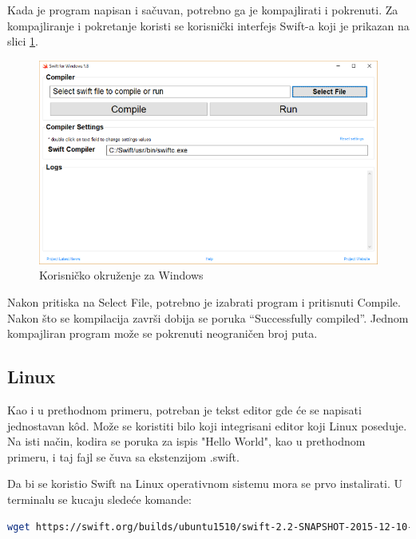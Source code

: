 \documentclass[a4paper]{article}
\begin{document}
Kada je program napisan i sačuvan, potrebno ga je kompajlirati i pokrenuti. Za kompajliranje i pokretanje koristi se korisnički interfejs Swift-a koji je prikazan na slici \ref{fig:windows}.

\begin{figure}[h!]
\begin{center}
\includegraphics[scale=0.27]{swift-win.png}
\end{center}
\caption{Korisničko okruženje za Windows}
\label{fig:windows}
\end{figure}

Nakon pritiska na Select File, potrebno je izabrati program i pritisnuti Compile. Nakon što se kompilacija završi dobija se poruka “Successfully compiled”.
Jednom kompajliran program može se pokrenuti neograničen broj puta.

\subsection{Linux}
\label{subsec:podnaslovLinux}
Kao i u prethodnom primeru, potreban je tekst editor gde će se napisati jednostavan k\^{o}d.
Može se koristiti bilo koji integrisani editor koji Linux poseduje. Na isti način, kodira se poruka za ispis "Hello World", kao u prethodnom primeru, i taj fajl se čuva sa ekstenzijom .swift.

Da bi se koristio Swift na Linux operativnom sistemu mora se prvo instalirati. U terminalu se kucaju sledeće komande:

\begin{lstlisting}[language=bash, caption={Instaliranje Swift-a}]
	wget https://swift.org/builds/ubuntu1510/swift-2.2-SNAPSHOT-2015-12-10-a/swift-2.2-SNAPSHOT-2015-12-10-a-ubuntu15.10.tar.gz
\end{lstlisting}
\end{document}
